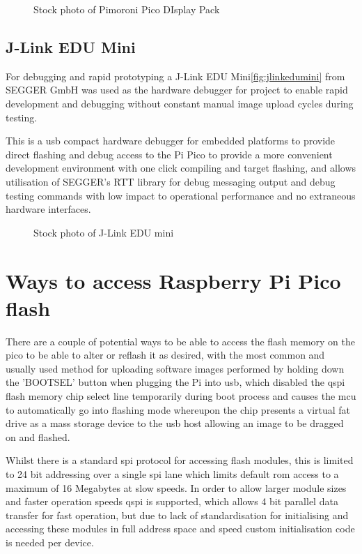 \begin{figure}[ht]
	\centering
	\caption{Stock photo of Pimoroni Pico DIsplay Pack\cite{PicoDisplayPack}}
	\label{fig:picodisplaypack}
\end{figure}
	
\clearpage
\subsection{J-Link EDU Mini}
For debugging and rapid prototyping a J-Link EDU Mini\cite{JLinkEDUMini}\autoref{fig:jlinkedumini} from SEGGER GmbH was used as the hardware debugger for project to enable rapid development and debugging without constant manual image upload cycles during testing.

This is a \gls{usb} compact hardware debugger for embedded platforms to provide direct flashing and debug access to the Pi Pico to provide a more convenient development environment with one click compiling and target flashing, and allows utilisation of SEGGER's RTT library for debug messaging output and debug testing commands with low impact to operational performance and no extraneous hardware interfaces.

\begin{figure}[ht]
	\centering
	\caption{Stock photo of J-Link EDU mini\cite{JLinkEDUMini}}
	\label{fig:jlinkedumini}
\end{figure}

\clearpage
\section{Ways to access Raspberry Pi Pico flash}

There are a couple of potential ways to be able to access the flash memory on the pico to be able to alter or reflash it as desired, with the most common and usually used method for uploading software images performed by holding down the 'BOOTSEL' button when plugging the Pi into \gls{usb}, which disabled the \gls{qspi} flash memory chip select line temporarily during boot process and causes the \gls{mcu} to automatically go into flashing mode whereupon the chip presents a virtual fat drive as a mass storage device to the \gls{usb} host allowing an image to be dragged on and flashed.

Whilst there is a standard \gls{spi} protocol for accessing flash modules, this is limited to 24 bit addressing over a single \gls{spi} lane which limits default \gls{rom} access to a maximum of 16 Megabytes at slow speeds. In order to allow larger module sizes and faster operation speeds \gls{qspi} is supported, which allows 4 bit parallel data transfer for fast operation, but due to lack of standardisation for initialising and accessing these modules in full address space and speed custom initialisation code is needed per device.

